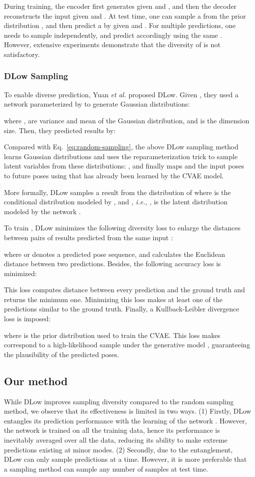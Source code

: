 \documentclass[sigconf,screen,nonacm]{acmart}
\begin{document}
	During training, the encoder  first generates  given  and , and then the decoder  reconstructs the input  given  and . 
At test time, one can sample a  from the prior distribution , and then predict a  by  given  and . For multiple predictions, one needs to sample  independently, and predict  accordingly using the same . However, extensive experiments demonstrate that the diversity of  is not satisfactory. 

	
	\subsubsection{DLow Sampling}
	To enable diverse prediction, Yuan \textit{et al.} \cite{yuan2020dlow} proposed DLow. Given , they used a network  parameterized by  to generate  Gaussian distributions: 
	
	where ,  are variance and mean of the  Gaussian distribution, and  is the dimension size. Then, they predicted  results by:
	
	Compared with Eq.~\ref{eq:random-sampling}, the above DLow sampling method learns  Gaussian distributions and uses the reparameterization trick to sample latent variables from these distributions: , and finally maps  and the input poses  to future poses using  that has already been learned by the CVAE model.
	
	More formally, DLow samples a result  from the distribution of  where  is the conditional distribution modeled by , and , \textit{i.e.,} , is the latent distribution modeled by the network . 
	
	To train , DLow minimizes the following diversity loss to enlarge the distances between pairs of results predicted from the same input :
	
	where  or  denotes a predicted pose sequence, and  calculates the Euclidean distance between two predictions. Besides, the following accuracy loss is minimized:
	
	This loss computes  distance between every prediction  and the ground truth  and returns the minimum one. Minimizing this loss makes at least one of the predictions similar to the ground truth. Finally, a Kullback-Leibler divergence loss is imposed:
	
where  is the prior distribution used to train the CVAE. This loss makes  correspond to a high-likelihood sample  under the generative model , guaranteeing the plausibility of the predicted poses.
	
	\subsection{Our method}
	\label{sec:our-method}
	While DLow improves sampling diversity compared to the random sampling method, we observe that its effectiveness is limited in two ways. (1) Firstly, DLow entangles its prediction performance with the learning of the network . However, the network is trained on all the training data, hence its performance is inevitably averaged over all the data, reducing its ability to make extreme predictions existing at minor modes. (2) Secondly, due to the entanglement, DLow can only sample  predictions at a time. However, it is more preferable that a sampling method can sample any number of samples at test time. 
\end{document}

